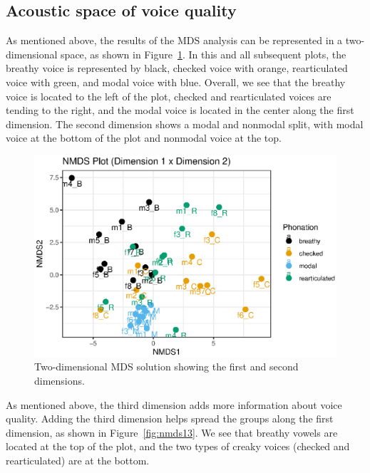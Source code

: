 \subsection{Acoustic space of voice quality} \label{sec:acousticlandscape:space}
As mentioned above, the results of the MDS analysis can be represented in a two-dimensional space, as shown in Figure~\ref{fig:nmds12}. In this and all subsequent plots, the breathy voice is represented by black, checked voice with orange, rearticulated voice with green, and modal voice with blue. Overall, we see that the breathy voice is located to the left of the plot, checked and rearticulated voices are tending to the right, and the modal voice is located in the center along the first dimension. The second dimension shows a modal and nonmodal split, with modal voice at the bottom of the plot and nonmodal voice at the top.
\begin{figure}[!h]
    \centering
    \includegraphics[width = \linewidth]{images/nmds12.eps}
    \caption{Two-dimensional MDS solution showing the first and second dimensions.}
    \label{fig:nmds12}
\end{figure}
    
As mentioned above, the third dimension adds more information about voice quality. Adding the third dimension helps spread the groups along the first dimension, as shown in Figure~\ref{fig:nmds13}. We see that breathy vowels are located at the top of the plot, and the two types of creaky voices (checked and rearticulated) are at the bottom. 

